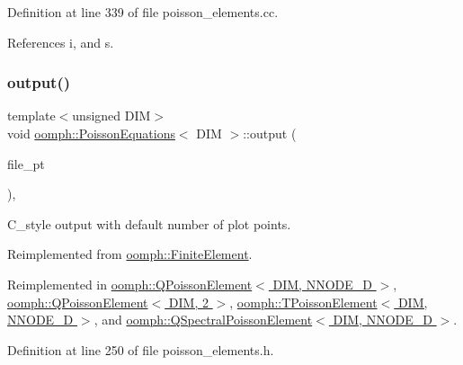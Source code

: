 Definition at line 339 of file poisson\+\_\+elements.\+cc.



References i, and s.

\mbox{\label{classoomph_1_1PoissonEquations_afeaa8b136b9cc9649635b41bde1b5cda}} 
\subsubsection{\texorpdfstring{output()}{output()}\hspace{0.1cm}{\footnotesize\ttfamily [3/4]}}
{\footnotesize\ttfamily template$<$unsigned D\+IM$>$ \\
void \hyperlink{classoomph_1_1PoissonEquations}{oomph\+::\+Poisson\+Equations}$<$ D\+IM $>$\+::output (\begin{DoxyParamCaption}\item[{F\+I\+LE $\ast$}]{file\+\_\+pt }\end{DoxyParamCaption})\hspace{0.3cm}{\ttfamily [inline]}, {\ttfamily [virtual]}}



C\+\_\+style output with default number of plot points. 



Reimplemented from \hyperlink{classoomph_1_1FiniteElement_a72cddd09f8ddbee1a20a1ff404c6943e}{oomph\+::\+Finite\+Element}.



Reimplemented in \hyperlink{classoomph_1_1QPoissonElement_adb597acc7de1a1b09eb25af0bce0fe9d}{oomph\+::\+Q\+Poisson\+Element$<$ D\+I\+M, N\+N\+O\+D\+E\+\_\+D $>$}, \hyperlink{classoomph_1_1QPoissonElement_adb597acc7de1a1b09eb25af0bce0fe9d}{oomph\+::\+Q\+Poisson\+Element$<$ D\+I\+M, 2 $>$}, \hyperlink{classoomph_1_1TPoissonElement_a289c196b8a84337341e306887c82e3db}{oomph\+::\+T\+Poisson\+Element$<$ D\+I\+M, N\+N\+O\+D\+E\+\_\+D $>$}, and \hyperlink{classoomph_1_1QSpectralPoissonElement_ac5588896f64d8c24a896dc0b30e7ec29}{oomph\+::\+Q\+Spectral\+Poisson\+Element$<$ D\+I\+M, N\+N\+O\+D\+E\+\_\+D $>$}.



Definition at line 250 of file poisson\+\_\+elements.\+h.



